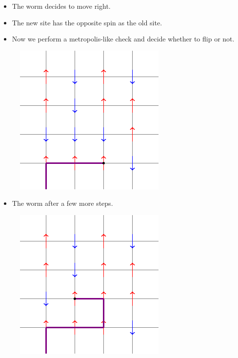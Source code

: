 \documentclass{beamer}
\begin{document}
\begin{frame}
\begin{itemize}
    \item The worm decides to move right.
    \item The new site has the opposite spin as the old site.
    \item Now we perform a metropolis-like check and decide whether to flip or not.
\end{itemize}
\begin{figure}
    \centering
    \includegraphics{tikz3.pdf}
\end{figure}
\end{frame}

\begin{frame}
\begin{itemize}
    \item The worm after a few more steps.
\end{itemize}
\begin{figure}
    \centering
    \includegraphics{tikz4.pdf}
\end{figure}
\end{frame}
\end{document}
